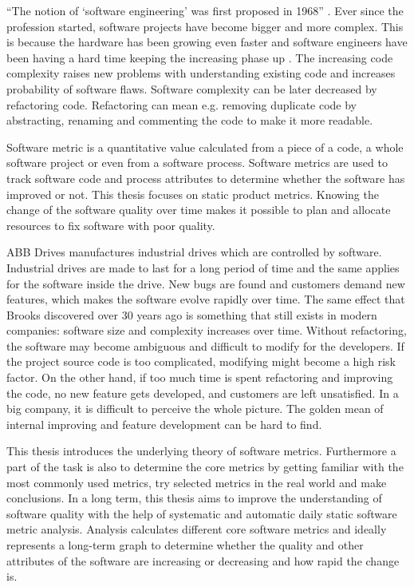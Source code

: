 “The notion of ‘software engineering’ was first proposed in 1968” \cite{sommerville2011software}. Ever since the profession started, software projects have become bigger and more complex. This is because the hardware has been growing even faster and software engineers have been having a hard time keeping the increasing phase up \cite{brooks1987no}. The increasing code complexity raises new problems with understanding existing code and increases probability of software flaws. Software complexity can be later decreased by refactoring code. Refactoring can mean e.g. removing duplicate code by abstracting, renaming and commenting the code to make it more readable.

Software metric is a quantitative value calculated from a piece of a code, a whole software project or even from a software process. Software metrics are used to track software code and process attributes to determine whether the software has improved or not. This thesis focuses on static product metrics. Knowing the change of the software quality over time makes it possible to plan and allocate resources to fix software with poor quality.

ABB Drives manufactures industrial drives which are controlled by software. Industrial drives are made to last for a long period of time and the same applies for the software inside the drive. New bugs are found and customers demand new features, which makes the software evolve rapidly over time. The same effect that Brooks discovered over 30 years ago is something that still exists in modern companies: software size and complexity increases over time. Without refactoring, the software may become ambiguous and difficult to modify for the developers. If the project source code is too complicated, modifying might become a high risk factor. On the other hand, if too much time is spent refactoring and improving the code, no new feature gets developed, and customers are left unsatisfied. In a big company, it is difficult to perceive the whole picture. The golden mean of internal improving and feature development can be hard to find.

This thesis introduces the underlying theory of software metrics. Furthermore a part of the task is also to determine the core metrics by getting familiar with the most commonly used metrics, try selected metrics in the real world and make conclusions. In a long term, this thesis aims to improve the understanding of software quality with the help of systematic and automatic daily static software metric analysis.  Analysis calculates different core software metrics and ideally represents a long-term graph to determine whether the quality and other attributes of the software are increasing or decreasing and how rapid the change is.

